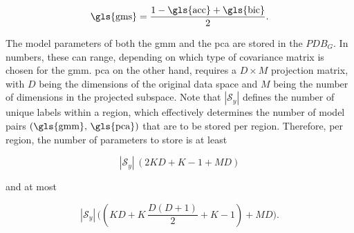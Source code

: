 \documentclass[../../main.tex]{subfiles}
\begin{document}
 \begin{equation}\label{eq:combined_metric}
    \text{\gls{gms}} = \frac{1 - \text{\gls{acc}} + \text{\gls{bic}}}{2}.
 \end{equation}
 
 The model parameters of both the \gls{gmm} and the \gls{pca} are stored in the $PDB_G$. In numbers, these can range, depending on which type of covariance matrix is chosen for the \gls{gmm}. \Acrshort{pca} on the other hand, requires a $D \times M$ projection matrix, with $D$ being the dimensions of the original data space and $M$ being the number of dimensions in the projected subspace. Note that $|\mathcal{S}_y|$ defines the number of unique labels within a region, which effectively determines the number of model pairs $(\text{\gls{gmm}, \gls{pca}})$ that are to be stored per region. Therefore, per region, the number of parameters to store is at least
 
 \begin{equation*}
    |\mathcal{S}_y| \, ( 2KD +K-1 + MD  )
 \end{equation*}

 and at most

 \begin{equation*}
    |\mathcal{S}_y| \, \bigl( (KD + K \, \frac{D(D+1)}{2}+K-1) + MD \bigr).
 \end{equation*}

\end{document}

